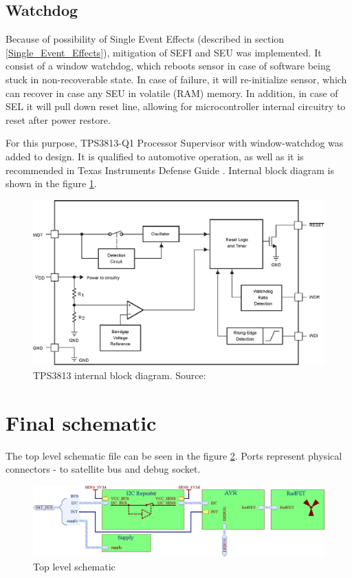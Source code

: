     \subsection{Watchdog}
        Because of possibility of Single Event Effects (described in section \ref{Single_Event_Effects}), mitigation of SEFI and SEU was implemented. It consist of a window watchdog, which reboots sensor in case of software being stuck in non-recoverable state. In case of failure, it will re-initialize sensor, which can recover in case any SEU in volatile (RAM) memory. In addition, in case of SEL it will pull down reset line, allowing for microcontroller internal circuitry to reset after power restore.

        For this purpose, TPS3813-Q1 Processor Supervisor with window-watchdog was added to design. It is qualified to automotive operation, as well as it is recommended in Texas Instruments Defense Guide \cite{TI_defense_guide}. Internal block diagram is shown in the figure \ref{TPS3813}.

        \begin{figure}[H]
            \centering
            \includegraphics[width=0.7\paperwidth]{img/06/tps3813.eps}
            \caption{TPS3813 internal block diagram. Source: \cite{TPS3813_datasheet}}
            \label{TPS3813}
        \end{figure}

\newpage
\section{Final schematic}
    The top level schematic file can be seen in the figure \ref{top_level_schematic}. Ports represent physical connectors - to satellite bus and debug socket.

    \begin{figure}[H]
        \centering
        \includegraphics[width=0.8\paperwidth]{img/06/final_schematic_top.eps}
        \caption{Top level schematic}
        \label{top_level_schematic}
    \end{figure}

